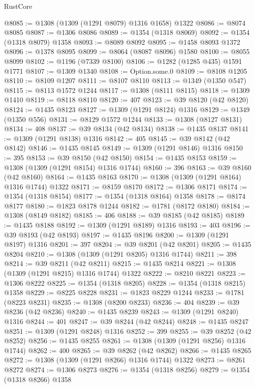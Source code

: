 \begin{lexlean}{RustCore}
\begin{coremodule}
@8085 := @1308 (@1309 (@1291 @8079) @1316 @1658) @1322
@8086 := @8074 @8085
@8087 := @1306 @8086
@8089 := @1354 (@1318 @8069)
@8092 := @1354 (@1318 @8079) @1358
@8093 := @8089 @8092
@8095 := @1458 @8093 @1372
@8096 := @1378 @8095
@8099 := @8064 (@8087 @8096) @1580
@8100 := @8055 @8099
@8102 := @1196 (@7339 @8100)
@8106 := @1282 (@1285 @435) @1591 @1771
@8107 := @1309 @1340
@8108 := Option.some.{0}
@8109 := @8108 @1205
@8110 := @8109 @1207
@8111 := @8107 @8110
@8113 := @1349 (@1350 @547)
@8115 := @8113 @1572 @1244
@8117 := @1308 (@8111 @8115)
@8118 := @1309 @1410
@8119 := @8118 @8110
@8120 := 407
@8123 := @39 @8120 (@42 @8120)
@8124 := @1435 @8123
@8127 := @1309 (@1291 @8124) @1316
@8129 := @1349 (@1350 @556)
@8131 := @8129 @1572 @1244
@8133 := @1308 (@8127 @8131)
@8134 := 408
@8137 := @39 @8134 (@42 @8134)
@8138 := @1435 @8137
@8141 := @1309 (@1291 @8138) @1316
@8142 := 405
@8145 := @39 @8142 (@42 @8142)
@8146 := @1435 @8145
@8149 := @1309 (@1291 @8146) @1316
@8150 := 395
@8153 := @39 @8150 (@42 @8150)
@8154 := @1435 @8153
@8159 := @1308 (@1309 (@1291 @8154) @1316 @1744)
@8160 := 396
@8163 := @39 @8160 (@42 @8160)
@8164 := @1435 @8163
@8170 := @1308 (@1309 (@1291 @8164) @1316 @1744) @1322
@8171 := @8159 @8170
@8172 := @1306 @8171
@8174 := @1354 (@1318 @8154)
@8177 := @1354 (@1318 @8164) @1358
@8178 := @8174 @8177
@8180 := @1823 @8178 @1244
@8182 := @1781 (@8172 @8180)
@8184 := @1308 (@8149 @8182)
@8185 := 406
@8188 := @39 @8185 (@42 @8185)
@8189 := @1435 @8188
@8192 := @1309 (@1291 @8189) @1316
@8193 := 403
@8196 := @39 @8193 (@42 @8193)
@8197 := @1435 @8196
@8200 := @1309 (@1291 @8197) @1316
@8201 := 397
@8204 := @39 @8201 (@42 @8201)
@8205 := @1435 @8204
@8210 := @1308 (@1309 (@1291 @8205) @1316 @1744)
@8211 := 398
@8214 := @39 @8211 (@42 @8211)
@8215 := @1435 @8214
@8221 := @1308 (@1309 (@1291 @8215) @1316 @1744) @1322
@8222 := @8210 @8221
@8223 := @1306 @8222
@8225 := @1354 (@1318 @8205)
@8228 := @1354 (@1318 @8215) @1358
@8229 := @8225 @8228
@8231 := @1823 @8229 @1244
@8233 := @1781 (@8223 @8231)
@8235 := @1308 (@8200 @8233)
@8236 := 404
@8239 := @39 @8236 (@42 @8236)
@8240 := @1435 @8239
@8243 := @1309 (@1291 @8240) @1316
@8244 := 401
@8247 := @39 @8244 (@42 @8244)
@8248 := @1435 @8247
@8251 := @1309 (@1291 @8248) @1316
@8252 := 399
@8255 := @39 @8252 (@42 @8252)
@8256 := @1435 @8255
@8261 := @1308 (@1309 (@1291 @8256) @1316 @1744)
@8262 := 400
@8265 := @39 @8262 (@42 @8262)
@8266 := @1435 @8265
@8272 := @1308 (@1309 (@1291 @8266) @1316 @1744) @1322
@8273 := @8261 @8272
@8274 := @1306 @8273
@8276 := @1354 (@1318 @8256)
@8279 := @1354 (@1318 @8266) @1358

\end{coremodule}
\end{lexlean}
